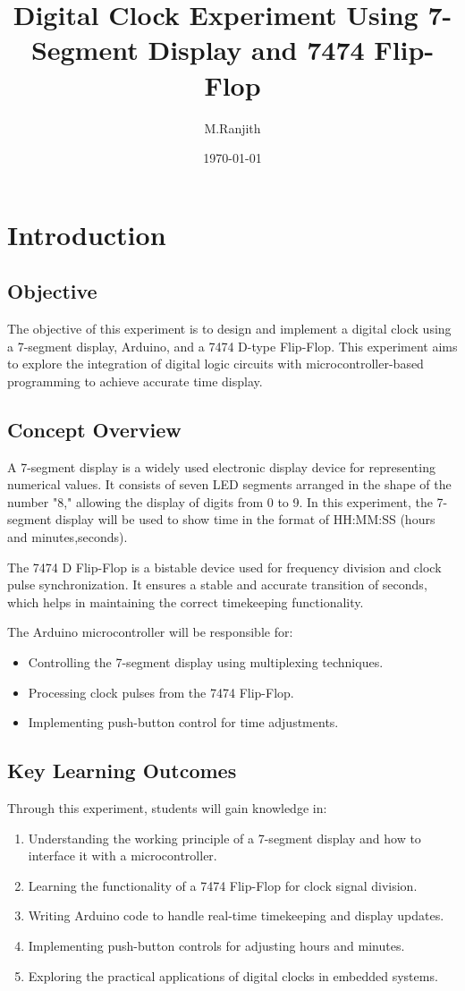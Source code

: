 \documentclass[a4paper,12pt]{article}
\title{Digital Clock Experiment Using 7-Segment Display and 7474 Flip-Flop}
\author{M.Ranjith}
\date{\today}
\begin{document}
\maketitle

\section{Introduction}

\subsection{Objective}
The objective of this experiment is to design and implement a {digital clock} using a {7-segment display}, {Arduino}, and a {7474 D-type Flip-Flop}. This experiment aims to explore the integration of digital logic circuits with microcontroller-based programming to achieve accurate time display.

\subsection{Concept Overview}
A 7-segment display is a widely used electronic display device for representing numerical values. It consists of seven LED segments arranged in the shape of the number "8," allowing the display of digits from 0 to 9. In this experiment, the 7-segment display will be used to show time in the format of {HH:MM:SS} (hours and minutes,seconds).

The {7474 D Flip-Flop} is a bistable device used for {frequency division} and {clock pulse synchronization}. It ensures a stable and accurate transition of seconds, which helps in maintaining the correct timekeeping functionality.

The {Arduino microcontroller} will be responsible for:
\begin{itemize}
    \item Controlling the 7-segment display using multiplexing techniques.
    \item Processing clock pulses from the 7474 Flip-Flop.
    \item Implementing push-button control for time adjustments.
\end{itemize}

\subsection{Key Learning Outcomes}
Through this experiment, students will gain knowledge in:
\begin{enumerate}
    \item Understanding the {working principle} of a 7-segment display and how to interface it with a microcontroller.
    \item Learning the {functionality} of a 7474 Flip-Flop for clock signal division.
    \item Writing {Arduino code} to handle real-time timekeeping and display updates.
    \item Implementing {push-button controls} for adjusting hours and minutes.
    \item Exploring the {practical applications} of digital clocks in embedded systems.
\end{enumerate}
\end{document}
